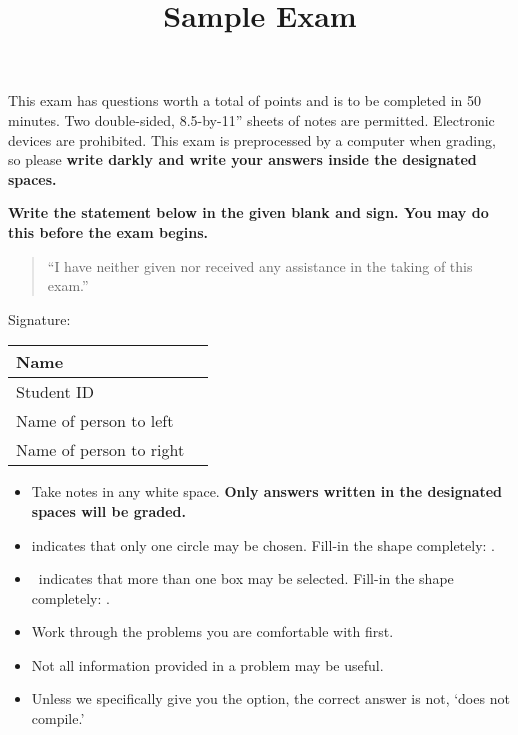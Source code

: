 \documentclass{cse}
\title{Sample Exam}
\newcommand{\name}{Kevin Lin}
\newcommand{\sid}{1234567890}
\newcommand{\nameleft}{Kevin Lin}
\newcommand{\nameright}{Kevin Lin}
\begin{document}
\maketitle

This exam has \numquestions{} questions worth a total of \numpoints{} points and is to be completed in 50 minutes.
Two double-sided, 8.5-by-11'' sheets of notes are permitted.
Electronic devices are prohibited.
This exam is preprocessed by a computer when grading, so please \textbf{write darkly and write your answers inside the designated spaces.}

\textbf{Write the statement below in the given blank and sign. You may do this before the exam begins.}

\begin{quote}
    ``I have neither given nor received any assistance in the taking of this exam.''
\end{quote}


\begin{flushright}
    Signature: \fillin[\name][2in]
\end{flushright}

\medskip

\begin{minipage}[t]{2.25in}
\begin{center}
\pointtable[v][questions]
\end{center}
\end{minipage}%
\begin{minipage}[t]{3.75in}
\renewcommand{\arraystretch}{2.235}
\begin{tabularx}{\textwidth}{|X|m{2in - 2\tabcolsep}|}
\hline
Name & \solinline{\name} \\
\hline
Student ID & \solinline{\sid} \\
\hline
Name of person to left & \solinline{\nameleft} \\
\hline
Name of person to right & \solinline{\nameright} \\
\hline
\end{tabularx}
\end{minipage}

\medskip

\begin{itemize}[itemsep=0pt]
\item Take notes in any white space. \textbf{Only answers written in the designated spaces will be graded.}
\item \mcqb{} indicates that only one circle may be chosen. Fill-in the shape completely: \mcqs{}.
\item \moqb{}\, indicates that more than one box may be selected. Fill-in the shape completely: \moqs{}.
\item Work through the problems you are comfortable with first.
\item Not all information provided in a problem may be useful.
\item Unless we specifically give you the option, the correct answer is not, `does not compile.'
\end{itemize}

\clearpage

\begin{questions}
\question[1] 
\end{questions}
\end{document}

